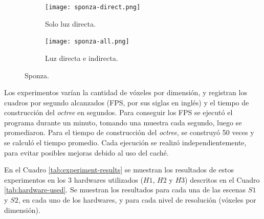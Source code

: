 \begin{figure}[H]
	\begin{subfigure}{0.49\textwidth}
	  \centering
	  \texttt{[image: sponza-direct.png]}
	  \caption{Solo luz directa.}
	\end{subfigure}
	\begin{subfigure}{0.49\textwidth}
	  \centering
	  \texttt{[image: sponza-all.png]}
	  \caption{Luz directa e indirecta.}
	\end{subfigure}
	\caption{Sponza.}
	\label{fig:sponza}
\end{figure}

Los experimentos varían la cantidad de vóxeles por dimensión, y registran los cuadros por segundo alcanzados (FPS, por sus siglas en inglés) y el tiempo de construcción del \textit{octree} en segundos.
Para conseguir los FPS se ejecutó el programa durante un minuto, tomando una muestra cada segundo, luego se promediaron.
Para el tiempo de construcción del \textit{octree}, se construyó 50 veces y se calculó el tiempo promedio.
Cada ejecución se realizó independientemente, para evitar posibles mejoras debido al uso del caché.

En el Cuadro \ref{tab:experiment-results} se muestran los resultados de estos experimentos en los 3 hardwares utilizados ($H1$, $H2$ y $H3$) descritos en el Cuadro \ref{tab:hardware-used}.
Se muestran los resultados para cada una de las escenas $S1$ y $S2$, en cada uno de los hardwares, y para cada nivel de resolución (vóxeles por dimensión).

